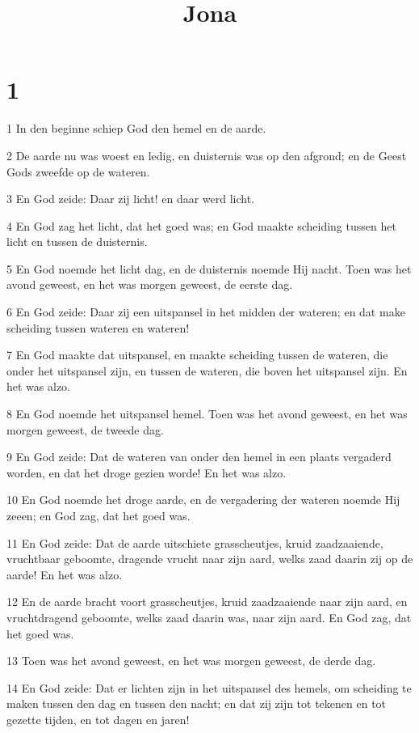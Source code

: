 

\title{Jona}



\chapter{1}

\par 1 In den beginne schiep God den hemel en de aarde.
\par 2 De aarde nu was woest en ledig, en duisternis was op den afgrond; en de Geest Gods zweefde op de wateren.
\par 3 En God zeide: Daar zij licht! en daar werd licht.
\par 4 En God zag het licht, dat het goed was; en God maakte scheiding tussen het licht en tussen de duisternis.
\par 5 En God noemde het licht dag, en de duisternis noemde Hij nacht. Toen was het avond geweest, en het was morgen geweest, de eerste dag.
\par 6 En God zeide: Daar zij een uitspansel in het midden der wateren; en dat make scheiding tussen wateren en wateren!
\par 7 En God maakte dat uitspansel, en maakte scheiding tussen de wateren, die onder het uitspansel zijn, en tussen de wateren, die boven het uitspansel zijn. En het was alzo.
\par 8 En God noemde het uitspansel hemel. Toen was het avond geweest, en het was morgen geweest, de tweede dag.
\par 9 En God zeide: Dat de wateren van onder den hemel in een plaats vergaderd worden, en dat het droge gezien worde! En het was alzo.
\par 10 En God noemde het droge aarde, en de vergadering der wateren noemde Hij zeeen; en God zag, dat het goed was.
\par 11 En God zeide: Dat de aarde uitschiete grasscheutjes, kruid zaadzaaiende, vruchtbaar geboomte, dragende vrucht naar zijn aard, welks zaad daarin zij op de aarde! En het was alzo.
\par 12 En de aarde bracht voort grasscheutjes, kruid zaadzaaiende naar zijn aard, en vruchtdragend geboomte, welks zaad daarin was, naar zijn aard. En God zag, dat het goed was.
\par 13 Toen was het avond geweest, en het was morgen geweest, de derde dag.
\par 14 En God zeide: Dat er lichten zijn in het uitspansel des hemels, om scheiding te maken tussen den dag en tussen den nacht; en dat zij zijn tot tekenen en tot gezette tijden, en tot dagen en jaren!
